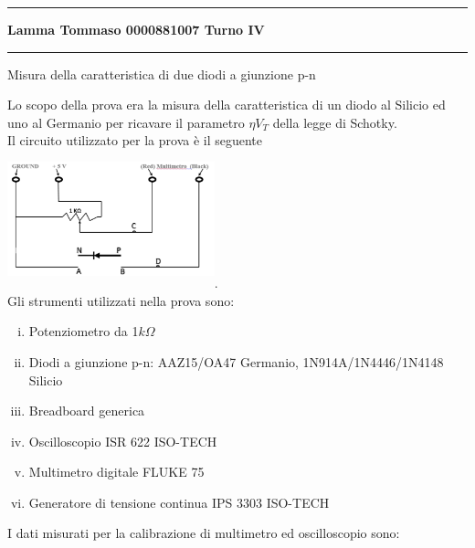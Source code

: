 \documentclass{article}
\begin{document}
    \begin{titlepage}
        \hrule
        \begin{center}
            \textbf{ Lamma    Tommaso    0000881007        Turno    IV }
        \end{center}
        \hrule
        \begin{center}
            {\huge Misura della caratteristica di due diodi a giunzione p-n}\\
        \end{center}
    \end{titlepage}
    Lo scopo della prova era la misura della caratteristica di un diodo al Silicio ed uno al Germanio
    per ricavare il parametro $\eta V_T$ della legge di Schotky.\\
    Il circuito utilizzato per la prova è il seguente \\
    \includegraphics[width = 6cm, height = 4cm]{circuito.png}.\\
    Gli strumenti utilizzati nella prova sono:
    \begin{enumerate}[(i)]
        \item Potenziometro da 1$k\Omega$
        \item Diodi a giunzione p-n: AAZ15/OA47 Germanio, 1N914A/1N4446/1N4148 Silicio
        \item Breadboard generica
        \item Oscilloscopio ISR 622 ISO-TECH
        \item Multimetro digitale FLUKE 75
        \item Generatore di tensione continua IPS 3303 ISO-TECH
    \end{enumerate}
    \newpage
    I dati misurati per la calibrazione di multimetro ed oscilloscopio sono:\\
\end{document}
